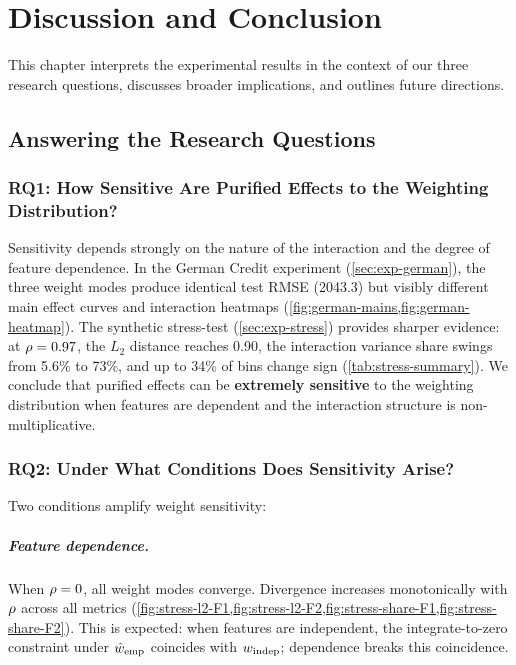 \chapter{Discussion and Conclusion}\label{chap:discussion}

This chapter interprets the experimental results in the context of our three research questions, discusses broader implications, and outlines future directions.

\section{Answering the Research Questions}

\subsection{RQ1: How Sensitive Are Purified Effects to the Weighting Distribution?}

Sensitivity depends strongly on the nature of the interaction and the degree of feature dependence.
In the German Credit experiment (\cref{sec:exp-german}), the three weight modes produce identical test RMSE (2043.3) but visibly different main effect curves and interaction heatmaps (\cref{fig:german-mains,fig:german-heatmap}).
The synthetic stress-test (\cref{sec:exp-stress}) provides sharper evidence: at $\rho = 0.97$, the $L_2$ distance reaches 0.90, the interaction variance share swings from 5.6\% to 73\%, and up to 34\% of bins change sign (\cref{tab:stress-summary}).
We conclude that purified effects can be \textbf{extremely sensitive} to the weighting distribution when features are dependent and the interaction structure is non-multiplicative.

\subsection{RQ2: Under What Conditions Does Sensitivity Arise?}

Two conditions amplify weight sensitivity:

\paragraph{Feature dependence.}
When $\rho = 0$, all weight modes converge.
Divergence increases monotonically with $\rho$ across all metrics (\cref{fig:stress-l2-F1,fig:stress-l2-F2,fig:stress-share-F1,fig:stress-share-F2}).
This is expected: when features are independent, the integrate-to-zero constraint under $\hat{w}_{\mathrm{emp}}$ coincides with $w_{\mathrm{indep}}$; dependence breaks this coincidence.

